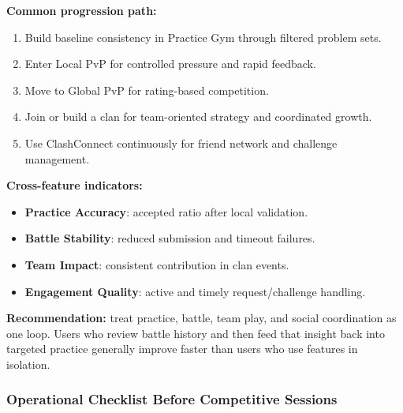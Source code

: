 \documentclass[12pt]{article}
\begin{document}
\textbf{Common progression path:}
\begin{enumerate}
\item Build baseline consistency in Practice Gym through filtered problem sets.
\item Enter Local PvP for controlled pressure and rapid feedback.
\item Move to Global PvP for rating-based competition.
\item Join or build a clan for team-oriented strategy and coordinated growth.
\item Use ClashConnect continuously for friend network and challenge management.
\end{enumerate}

\textbf{Cross-feature indicators:}
\begin{itemize}
\item \textbf{Practice Accuracy}: accepted ratio after local validation.
\item \textbf{Battle Stability}: reduced submission and timeout failures.
\item \textbf{Team Impact}: consistent contribution in clan events.
\item \textbf{Engagement Quality}: active and timely request/challenge handling.
\end{itemize}

\textbf{Recommendation:} treat practice, battle, team play, and social coordination as one loop. Users who review battle history and then feed that insight back into targeted practice generally improve faster than users who use features in isolation.


\subsubsection{Operational Checklist Before Competitive Sessions}
\end{document}
